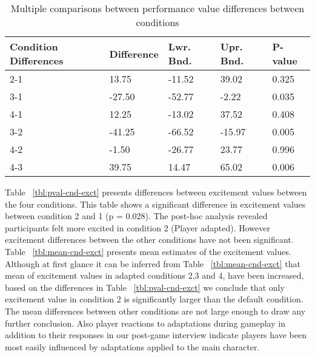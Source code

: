\documentclass[conference]{IEEEtran}
\begin{document}
\begin{table}[h]
\caption{Multiple comparisons between performance value differences between conditions}
\label{tbl:pval-cnd-perf}
\centering
\begin{tabular}{lllll}
\hline
Condition \newline
Differences &   Difference  &   Lwr. Bnd.      &     Upr. Bnd.   &  P-value     \\
\hline
2-1         &    13.75      &     -11.52       &      39.02      &  0.325       \\
3-1         &   -27.50      &     -52.77       &      -2.22      &  0.035       \\
4-1         &    12.25      &     -13.02       &      37.52      &  0.408       \\
3-2         &   -41.25      &     -66.52       &     -15.97      &  0.005       \\
4-2         &    -1.50      &     -26.77       &      23.77      &  0.996       \\
4-3         &    39.75      &     14.47        &      65.02      &  0.006       \\
\hline
\end{tabular}
\end{table}

Table ~\ref{tbl:pval-cnd-exct} presents differences between excitement values between the four conditions. This table shows a significant difference in excitement values between condition 2 and 1 (p = 0.028). The post-hoc analysis revealed participants felt more excited in condition 2 (Player adapted). However excitement differences between the other conditions have not been significant. Table ~\ref{tbl:mean-cnd-exct} presents mean estimates of the excitement values. Although at first glance it can be inferred from Table ~\ref{tbl:mean-cnd-exct} that mean of excitement values in adapted conditions 2,3 and 4, have been increased, based on the differences in Table ~\ref{tbl:pval-cnd-exct} we conclude that only excitement value in condition 2 is significantly larger than the default condition. The mean differences between other conditions are not large enough to draw any further conclusion. Also player reactions to adaptations during gameplay in addition to their responses in our post-game interview indicate players have been most easily influenced by adaptations applied to the main character.
\end{document}
